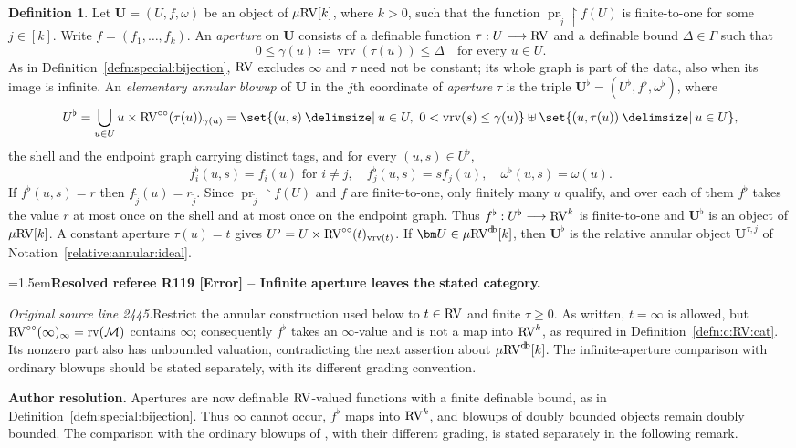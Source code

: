 \documentclass[12pt]{amsart}
\newcommand{\ResolvedRefereeRemark}[5]{%
  \par\medskip\begingroup\normalfont\small\color{gray}%
  \emergencystretch=1.5em\noindent\textbf{Resolved referee R#1 [#2] -- #3.}\par\nobreak\noindent #4\par
  \medskip\color{ResolutionGreen}\noindent\textbf{Author resolution.} #5\par
  \endgroup\medskip
}
\newcommand{\memph}[1]{{\color{magenta}\emph{#1}}}
\theoremstyle{plain}
\theoremstyle{definition}
\newtheorem{defn}[thm]{Definition}
\theoremstyle{remark}
\numberwithin{equation}{section}
\theoremstyle{plain}
\newcommand{\RV}{\textup{RV}}
\newcommand{\MM}{\mdl M}
\DeclareMathOperator{\pr}{pr}
\newcommand{\0}{\emptyset}
\newcommand{\mdl}[1]{\mathcal{#1}}  %
\newcommand{\rest}{\upharpoonright}
\newcommand{\fun}{\longrightarrow}
\providecommand\given{}
\newcommand\SetSymbol[1][]{%
\nonscript \: #1 \vert
\allowbreak
\nonscript\:
\mathopen{}}
\renewcommand\given{\SetSymbol[\delimsize]}
\newcommand{\mRV}{{\mu}{\RV}}
\DeclareMathOperator{\rv}{rv}
\DeclareMathOperator{\vrv}{vrv}
\DeclareMathOperator{\db}{d \! b}
\newcommand{\ccirc}{\circ \circ}
\begin{document}
\begin{defn}\label{defn:blowup:coa}
Let $\bm U = (U, f, \omega)$ be an object of $\mRV[k]$, where $k > 0$, such that the function $\pr_{\tilde j} \rest f(U)$ is finite-to-one for some $j \in [k]$. Write $f = (f_1, \ldots, f_k)$. An \memph{aperture} on $\bm U$ consists of a definable function $\tau : U \fun \RV$ and a definable bound $\Delta \in \Gamma$ such that
\[
0 \leq \gamma(u) \coloneqq \vrv(\tau(u)) \leq \Delta \quad \text{for every } u \in U.
\]
As in Definition~\ref{defn:special:bijection}, $\RV$ excludes $\infty$ and $\tau$ need not be constant; its whole graph is part of the data, also when its image is infinite. An \memph{elementary annular blowup} of $\bm U$ in the $j$th coordinate of \memph{aperture} $\tau$ is the triple $\bm U^{\flat} = (U^{\flat}, f^{\flat}, \omega^\flat)$, where
\[
U^{\flat} = \bigcup_{u \in U} u \times \RV^{\ccirc}(\tau(u))_{\gamma(u)} = \set{(u, s) \given u \in U,\ 0 < \vrv(s) \leq \gamma(u)} \uplus \set{(u, \tau(u)) \given u \in U},
\]
the shell and the endpoint graph carrying distinct tags, and for every $(u, s) \in U^{\flat}$,
\[
f^{\flat}_{i}(u, s) = f_{i}(u) \text{ for } i \neq j, \quad f^{\flat}_{j}(u, s) = s f_{j}(u), \quad \omega^\flat(u, s) = \omega(u).
\]
If $f^\flat(u, s) = r$ then $f_{\tilde j}(u) = r_{\tilde j}$. Since $\pr_{\tilde j} \rest f(U)$ and $f$ are finite-to-one, only finitely many $u$ qualify, and over each of them $f^\flat$ takes the value $r$ at most once on the shell and at most once on the endpoint graph. Thus $f^\flat : U^\flat \fun \RV^k$ is finite-to-one and $\bm U^\flat$ is an object of $\mRV[k]$. A constant aperture $\tau(u) = t$ gives $U^\flat = U \times \RV^{\ccirc}(t)_{\vrv(t)}$. If $\bm U \in \mRV^{\db}[k]$, then $\bm U^\flat$ is the relative annular object $\bm U^{\tau, j}$ of Notation~\ref{relative:annular:ideal}.

\ResolvedRefereeRemark{119}{Error}{Infinite aperture leaves the stated category}{%
\textit{Original source line 2445.}\quad Restrict the annular construction used below to $t\in\RV$ and finite $\tau\geq0$. As written, $t=\infty$ is allowed, but $\RV^{\ccirc}(\infty)_\infty=\rv(\MM)$ contains $\infty$; consequently $f^\flat$ takes an $\infty$-value and is not a map into $\RV^k$, as required in Definition~\ref{defn:c:RV:cat}. Its nonzero part also has unbounded valuation, contradicting the next assertion about $\mRV^{\db}[k]$. The infinite-aperture comparison with ordinary blowups should be stated separately, with its different grading convention.
}{Apertures are now definable $\RV$-valued functions with a finite definable bound, as in Definition~\ref{defn:special:bijection}. Thus $\infty$ cannot occur, $f^\flat$ maps into $\RV^k$, and blowups of doubly bounded objects remain doubly bounded. The comparison with the ordinary blowups of \cite{Yin:int:acvf}, with their different grading, is stated separately in the following remark.}


\end{defn}
\end{document}
